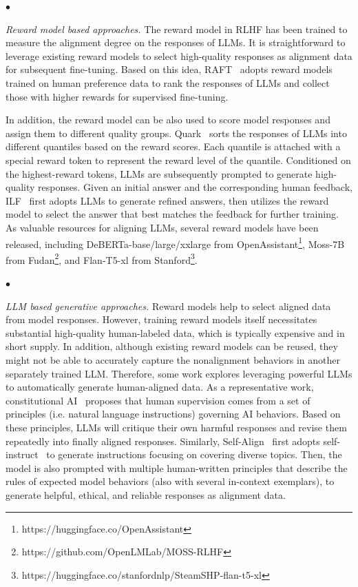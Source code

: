 $\bullet$  {\textit{Reward model based approaches.} The reward model in RLHF has been trained to measure the alignment degree on {the responses of LLMs}. It is straightforward to leverage existing reward models to select high-quality responses as alignment data for subsequent fine-tuning. Based on this idea, RAFT~\cite{Dong-RAFT-2023-arxiv} adopts reward models trained on human preference data to rank the responses of LLMs and collect those with higher rewards for supervised fine-tuning. 

In addition, the reward model can be also used to score model responses and assign them to different quality groups. Quark~\cite{Lu-nips-2022-quark} sorts the responses of LLMs into different quantiles based on the reward scores. Each quantile is attached with a special reward token to represent the reward level of the quantile. Conditioned on the highest-reward tokens, LLMs are subsequently prompted to generate high-quality responses. {Given an initial answer and the corresponding human feedback, ILF~\cite{Scheurer-arxiv-2023-ILF} first adopts LLMs to generate refined answers, then utilizes the reward model to select the answer that best matches the feedback for further training.} As valuable resources for aligning LLMs, several reward models have been released, including DeBERTa-base/large/xxlarge from OpenAssistant\footnote{https://huggingface.co/OpenAssistant}, Moss-7B from Fudan\footnote{https://github.com/OpenLMLab/MOSS-RLHF}, and Flan-T5-xl from Stanford\footnote{https://huggingface.co/stanfordnlp/SteamSHP-flan-t5-xl}.

$\bullet$ {\textit{LLM based generative approaches.} Reward models help to select aligned data from model responses. However, training reward models itself necessitates substantial high-quality human-labeled data, which is typically expensive and in short supply. In addition, although existing reward models can be reused, they might not be able to accurately capture the nonalignment behaviors in another separately trained LLM. Therefore, some work explores leveraging powerful LLMs to automatically generate human-aligned data. As a representative work, constitutional AI~\cite{Bai-arXiv-2022-Constitutional} proposes  that human supervision comes from a set of principles (i.e. natural language instructions) governing AI behaviors. Based on these principles, LLMs will critique their own harmful responses and revise them repeatedly into finally aligned responses. Similarly, Self-Align~\cite{Sun-arxiv-2023-Principle} first adopts self-instruct~\cite{Wang-arXiv-2022-Self} to generate instructions focusing on covering diverse topics. Then, the model is also prompted with multiple human-written principles that describe the rules of expected model behaviors (also with several in-context exemplars), to generate helpful, ethical, and reliable responses as alignment data. 

}}
